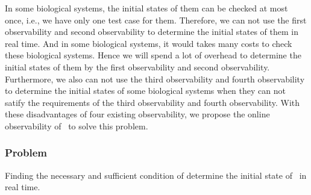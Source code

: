 In some biological systems, the initial states of them can be checked at most once, i.e., we have only one test case for them. Therefore, we can not use the first observability and second observability to determine the initial states of them in real time. And in some biological systems, it would takes many costs to check these biological systems. Hence we will spend a lot of overhead to determine the initial states of them by the first observability and second observability. Furthermore, we also can not use the third observability and fourth observability to determine the initial states of some biological systems when they can not satify the requirements of the third observability and fourth observability. With these disadvantages of four existing observability, we propose the online observability of \BCNs\ to solve this problem.
 \subsubsection*{Problem}
Finding the necessary and sufficient condition of determine the initial state of \BCNs\ in real time.